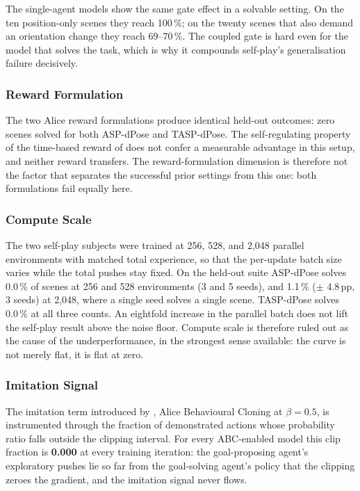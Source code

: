 The single-agent models show the same gate effect in a solvable setting. On the
ten position-only scenes they reach 100\,\%; on the twenty scenes that also
demand an orientation change they reach 69--70\,\%. The coupled gate is hard even
for the model that solves the task, which is why it compounds self-play's
generalisation failure decisively.

\subsubsection{Reward Formulation}
\label{sec:rq2_reward}

The two Alice reward formulations produce identical held-out outcomes: zero
scenes solved for both ASP-dPose and TASP-dPose. The self-regulating property of
the time-based reward of \cite{Sukhbaatar2018IntrinsicMotivation} does not confer
a measurable advantage in this setup, and neither reward transfers. The
reward-formulation dimension is therefore not the factor that
separates the successful prior settings from this one: both formulations fail
equally here.

\subsubsection{Compute Scale}
\label{sec:rq2_scale}

The two self-play subjects were trained at 256, 528, and 2{,}048 parallel
environments with matched total experience, so that the per-update batch size
varies while the total pushes stay fixed. On the held-out suite ASP-dPose solves
0.0\,\% of scenes at 256 and 528 environments (3 and 5 seeds), and 1.1\,\%
($\pm$ 4.8\,pp, 3 seeds) at 2{,}048, where a single seed solves a single scene.
TASP-dPose solves 0.0\,\% at all three counts. An eightfold increase in the
parallel batch does not lift the self-play result above the noise floor. Compute
scale is therefore ruled out as the cause of the underperformance, in the
strongest sense available: the curve is not merely flat, it is flat at zero.

\subsubsection{Imitation Signal}
\label{sec:rq2_abc}

The imitation term introduced by \cite{OpenAI2021AsymmetricSF}, Alice
Behavioural Cloning at $\beta = 0.5$, is instrumented through the fraction of
demonstrated actions whose probability ratio falls outside the clipping interval.
For every ABC-enabled model this clip fraction is \textbf{0.000} at every
training iteration: the goal-proposing agent's exploratory pushes lie so far from
the goal-solving agent's policy that the clipping zeroes the gradient, and the
imitation signal never flows.

